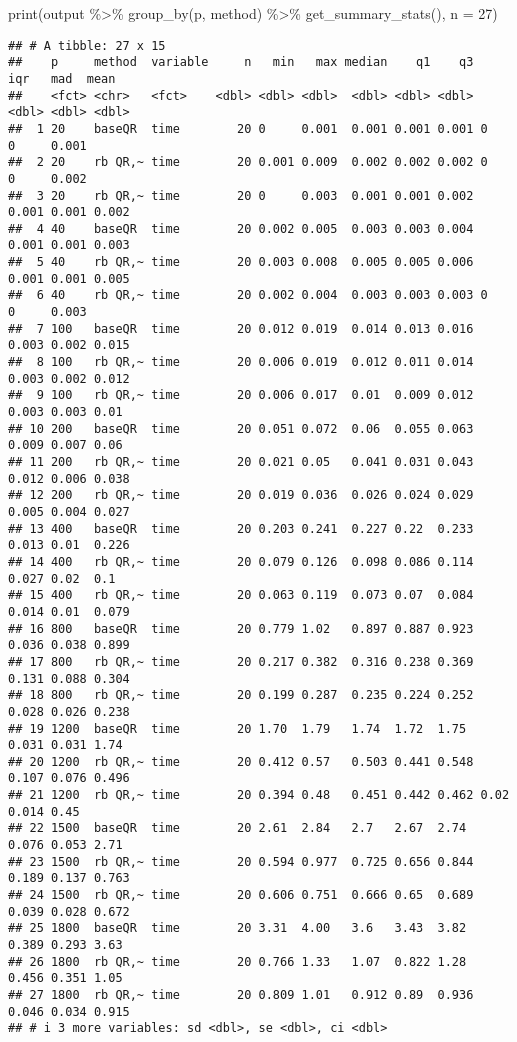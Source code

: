 \documentclass[]{tufte-handout}
\newenvironment{Shaded}{}{}
\newcommand{\AttributeTok}[1]{\textcolor[rgb]{0.49,0.56,0.16}{#1}}
\newcommand{\DecValTok}[1]{\textcolor[rgb]{0.25,0.63,0.44}{#1}}
\newcommand{\FunctionTok}[1]{\textcolor[rgb]{0.02,0.16,0.49}{#1}}
\newcommand{\NormalTok}[1]{#1}
\newcommand{\SpecialCharTok}[1]{\textcolor[rgb]{0.25,0.44,0.63}{#1}}
\begin{document}
\begin{Shaded}
\begin{Highlighting}[]
\FunctionTok{print}\NormalTok{(output }\SpecialCharTok{\%\textgreater{}\%}
        \FunctionTok{group\_by}\NormalTok{(p, method) }\SpecialCharTok{\%\textgreater{}\%}
        \FunctionTok{get\_summary\_stats}\NormalTok{(), }\AttributeTok{n =} \DecValTok{27}\NormalTok{)}
\end{Highlighting}
\end{Shaded}

\begin{verbatim}
## # A tibble: 27 x 15
##    p     method  variable     n   min   max median    q1    q3   iqr   mad  mean
##    <fct> <chr>   <fct>    <dbl> <dbl> <dbl>  <dbl> <dbl> <dbl> <dbl> <dbl> <dbl>
##  1 20    baseQR  time        20 0     0.001  0.001 0.001 0.001 0     0     0.001
##  2 20    rb QR,~ time        20 0.001 0.009  0.002 0.002 0.002 0     0     0.002
##  3 20    rb QR,~ time        20 0     0.003  0.001 0.001 0.002 0.001 0.001 0.002
##  4 40    baseQR  time        20 0.002 0.005  0.003 0.003 0.004 0.001 0.001 0.003
##  5 40    rb QR,~ time        20 0.003 0.008  0.005 0.005 0.006 0.001 0.001 0.005
##  6 40    rb QR,~ time        20 0.002 0.004  0.003 0.003 0.003 0     0     0.003
##  7 100   baseQR  time        20 0.012 0.019  0.014 0.013 0.016 0.003 0.002 0.015
##  8 100   rb QR,~ time        20 0.006 0.019  0.012 0.011 0.014 0.003 0.002 0.012
##  9 100   rb QR,~ time        20 0.006 0.017  0.01  0.009 0.012 0.003 0.003 0.01 
## 10 200   baseQR  time        20 0.051 0.072  0.06  0.055 0.063 0.009 0.007 0.06 
## 11 200   rb QR,~ time        20 0.021 0.05   0.041 0.031 0.043 0.012 0.006 0.038
## 12 200   rb QR,~ time        20 0.019 0.036  0.026 0.024 0.029 0.005 0.004 0.027
## 13 400   baseQR  time        20 0.203 0.241  0.227 0.22  0.233 0.013 0.01  0.226
## 14 400   rb QR,~ time        20 0.079 0.126  0.098 0.086 0.114 0.027 0.02  0.1  
## 15 400   rb QR,~ time        20 0.063 0.119  0.073 0.07  0.084 0.014 0.01  0.079
## 16 800   baseQR  time        20 0.779 1.02   0.897 0.887 0.923 0.036 0.038 0.899
## 17 800   rb QR,~ time        20 0.217 0.382  0.316 0.238 0.369 0.131 0.088 0.304
## 18 800   rb QR,~ time        20 0.199 0.287  0.235 0.224 0.252 0.028 0.026 0.238
## 19 1200  baseQR  time        20 1.70  1.79   1.74  1.72  1.75  0.031 0.031 1.74 
## 20 1200  rb QR,~ time        20 0.412 0.57   0.503 0.441 0.548 0.107 0.076 0.496
## 21 1200  rb QR,~ time        20 0.394 0.48   0.451 0.442 0.462 0.02  0.014 0.45 
## 22 1500  baseQR  time        20 2.61  2.84   2.7   2.67  2.74  0.076 0.053 2.71 
## 23 1500  rb QR,~ time        20 0.594 0.977  0.725 0.656 0.844 0.189 0.137 0.763
## 24 1500  rb QR,~ time        20 0.606 0.751  0.666 0.65  0.689 0.039 0.028 0.672
## 25 1800  baseQR  time        20 3.31  4.00   3.6   3.43  3.82  0.389 0.293 3.63 
## 26 1800  rb QR,~ time        20 0.766 1.33   1.07  0.822 1.28  0.456 0.351 1.05 
## 27 1800  rb QR,~ time        20 0.809 1.01   0.912 0.89  0.936 0.046 0.034 0.915
## # i 3 more variables: sd <dbl>, se <dbl>, ci <dbl>
\end{verbatim}
\end{document}
